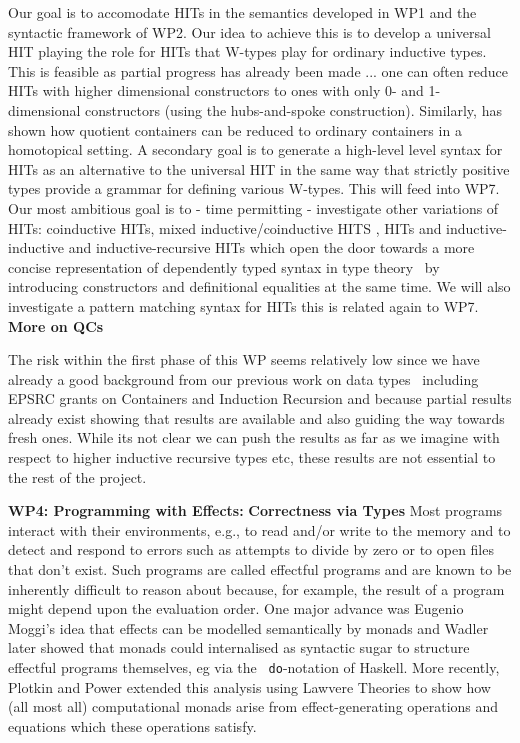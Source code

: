 \documentclass[a4paper,11pt]{article}
\begin{document}
Our goal is to accomodate HITs in the semantics developed in WP1 and
the syntactic framework of WP2. Our idea to achieve this is to develop
a universal HIT playing the role for HITs that W-types play for
ordinary inductive types. This is feasible as partial progress has
already been made ... one can often reduce HITs with higher
dimensional constructors to ones with only 0- and 1-dimensional
constructors (using the hubs-and-spoke construction). 
Similarly, \cite{gylterud:thesis,kock:groupoids} has shown how quotient 
containers can be reduced to ordinary containers in a homotopical 
setting. A secondary goal
is to generate a high-level level syntax for HITs as an alternative to
the universal HIT in the same way that strictly positive types provide
a grammar for defining various W-types. This will feed into WP7.  Our
most ambitious goal is to - time permitting - investigate other
variations of HITs: coinductive HITs, mixed inductive/coinductive HITS
\cite{txa-nisse}, HITs and inductive-inductive and inductive-recursive
HITs which open the door towards a more concise representation of
dependently typed syntax in type theory~\cite{chapman2009type} by
introducing constructors and definitional equalities at the same
time. We will also investigate a pattern matching syntax for HITs this
is related again to WP7. {\bf More on QCs}


The risk within the first phase of this WP seems relatively low since we
have already a good background from our previous work on data
types~\cite{II_etc} including EPSRC grants on Containers and Induction
Recursion and because partial results already exist showing that
results are available and also guiding the way towards fresh
ones. While its not clear we can push the results as far as we imagine
with respect to higher inductive recursive types etc, these results
are not essential to the rest of the project.


{\bf WP4: Programming with Effects:} {\bf Correctness via Types} Most
programs interact with their environments, e.g., to read and/or write
to the memory and to detect and respond to errors such as attempts to
divide by zero or to open files that don’t exist. Such programs are
called effectful programs and are known to be inherently difficult to
reason about because, for example, the result of a program might
depend upon the evaluation order. One major advance was Eugenio
Moggi’s idea that effects can be modelled semantically by monads and
Wadler later showed that monads could internalised as syntactic sugar
to structure effectful programs themselves, eg via the {\tt
  do}-notation of Haskell. More recently, Plotkin and Power extended
this analysis using Lawvere Theories to show how (all most all)
computational monads arise from effect-generating operations and
equations which these operations satisfy.
\end{document}
